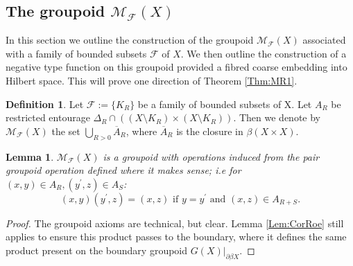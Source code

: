 \documentclass[preprint]{elsarticle}
\theoremstyle{plain}
\newtheorem{lemma}[theorem]{Lemma}%
\theoremstyle{definition}%
\newtheorem{definition}[theorem]{Definition}%
\theoremstyle{remark}%
\begin{document}
\subsection{The groupoid $\mathcal{M}_{\mathcal{F}}(X)$}

In this section we outline the construction of the groupoid $\mathcal{M}_{\mathcal{F}}(X)$ associated with a family of bounded subsets $\mathcal{F}$ of $X$. We then outline the construction of a negative type function on this groupoid provided a fibred coarse embedding into Hilbert space. This will prove one direction of Theorem \ref{Thm:MR1}.

\begin{definition}
Let $\mathcal{F}:=\lbrace K_{R} \rbrace$ be a family of bounded subsets of X. Let $A_{R}$ be restricted entourage $\Delta_{R}\cap ((X\setminus K_{R}) \times (X\setminus K_{R}))$. Then we denote by $\mathcal{M}_{\mathcal{F}}(X)$ the set $\bigcup_{R>0} \overline{A}_{R}$, where $\overline{A}_{R}$ is the closure in $\beta (X\times X)$.
\end{definition}

\begin{lemma}
$\mathcal{M}_{\mathcal{F}}(X)$ is a groupoid with operations induced from the pair groupoid operation defined where it makes sense; i.e for $(x,y) \in A_{R}, (y^{'},z)\in A_{S}$:
\begin{equation*}
(x,y)(y^{'},z)=(x,z) \mbox{ if } y=y^{'} \mbox{ and } (x,z) \in A_{R+S}.
\end{equation*}
\end{lemma}
\begin{proof}
The groupoid axioms are technical, but clear. Lemma \ref{Lem:CorRoe} still applies to ensure this product passes to the boundary, where it defines the same product present on the boundary groupoid $G(X)|_{\partial\beta X}$.
\end{proof}
\end{document}
